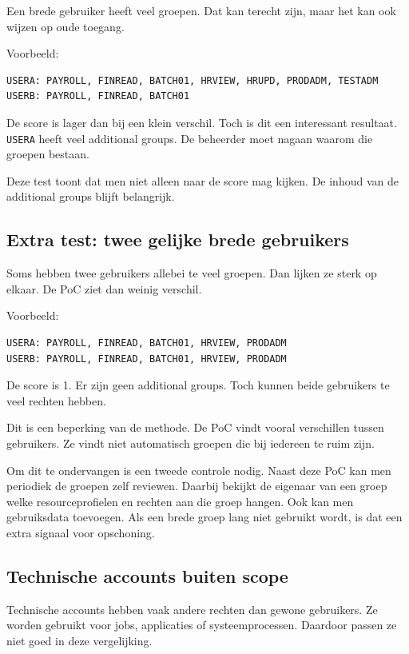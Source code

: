 Een brede gebruiker heeft veel groepen. Dat kan terecht zijn, maar het kan ook wijzen op oude toegang.

Voorbeeld:

\begin{verbatim}
USERA: PAYROLL, FINREAD, BATCH01, HRVIEW, HRUPD, PRODADM, TESTADM
USERB: PAYROLL, FINREAD, BATCH01
\end{verbatim}

De score is lager dan bij een klein verschil. Toch is dit een interessant resultaat. \texttt{USERA} heeft veel additional groups. De beheerder moet nagaan waarom die groepen bestaan.

Deze test toont dat men niet alleen naar de score mag kijken. De inhoud van de additional groups blijft belangrijk.

\subsection*{Extra test: twee gelijke brede gebruikers}

Soms hebben twee gebruikers allebei te veel groepen. Dan lijken ze sterk op elkaar. De PoC ziet dan weinig verschil.

Voorbeeld:

\begin{verbatim}
USERA: PAYROLL, FINREAD, BATCH01, HRVIEW, PRODADM
USERB: PAYROLL, FINREAD, BATCH01, HRVIEW, PRODADM
\end{verbatim}

De score is 1. Er zijn geen additional groups. Toch kunnen beide gebruikers te veel rechten hebben.

Dit is een beperking van de methode. De PoC vindt vooral verschillen tussen gebruikers. Ze vindt niet automatisch groepen die bij iedereen te ruim zijn.

Om dit te ondervangen is een tweede controle nodig. Naast deze PoC kan men periodiek de groepen zelf reviewen. Daarbij bekijkt de eigenaar van een groep welke resourceprofielen en rechten aan die groep hangen. Ook kan men gebruiksdata toevoegen. Als een brede groep lang niet gebruikt wordt, is dat een extra signaal voor opschoning.

\subsection*{Technische accounts buiten scope}

Technische accounts hebben vaak andere rechten dan gewone gebruikers. Ze worden gebruikt voor jobs, applicaties of systeemprocessen. Daardoor passen ze niet goed in deze vergelijking.

